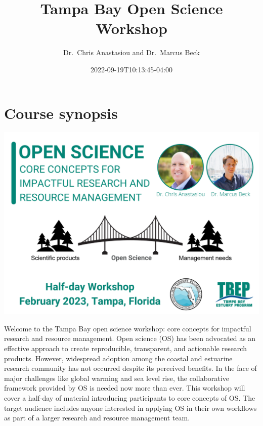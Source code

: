 \documentclass[
  letterpaper,
  DIV=11,
  numbers=noendperiod]{scrreprt}
\title{Tampa Bay Open Science Workshop}
\author{Dr.~Chris Anastasiou and Dr.~Marcus Beck}
\date{2022-09-19T10:13:45-04:00}
\renewcommand*\contentsname{Table of contents}
\newcommand\contentsname{Table of contents}
\begin{document}
\maketitle
\ifdefined\Shaded\renewenvironment{Shaded}{\begin{tcolorbox}[frame hidden, boxrule=0pt, borderline west={3pt}{0pt}{shadecolor}, enhanced, breakable, interior hidden, sharp corners]}{\end{tcolorbox}}\fi

\renewcommand*\contentsname{Table of contents}
{
\hypersetup{linkcolor=}
\setcounter{tocdepth}{2}
\tableofcontents
}

\hypertarget{course-synopsis}{%
\chapter*{Course synopsis}\label{course-synopsis}}

\includegraphics{./img/2023 Open Science Workshop.png}

Welcome to the Tampa Bay open science workshop: core concepts for
impactful research and resource management. Open science (OS) has been
advocated as an effective approach to create reproducible, transparent,
and actionable research products. However, widespread adoption among the
coastal and estuarine research community has not occurred despite its
perceived benefits. In the face of major challenges like global warming
and sea level rise, the collaborative framework provided by OS is needed
now more than ever. This workshop will cover a half-day of material
introducing participants to core concepts of OS. The target audience
includes anyone interested in applying OS in their own workflows as part
of a larger research and resource management team.
\end{document}
